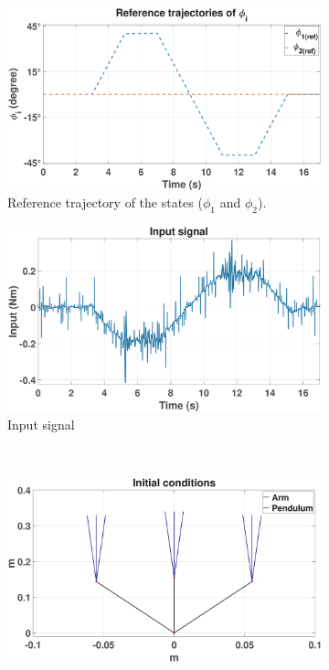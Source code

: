 \begin{figure}[ht]
    \captionsetup[subfigure]{justification=centering}
    \centering
    \begin{subfigure}[t]{1\textwidth}
    \centering
    \includegraphics[width=1\linewidth]{figures/Reference}
    \caption{Reference trajectory of the states ($\phi_1$ and $\phi_2$).}
    \label{fig:ReferenceTraj}
    \end{subfigure}%
    \vspace{0.5em}
    \begin{subfigure}[t]{0.485\textwidth}
    \centering
    \includegraphics[width=\textwidth]{figures/RefInput}
    \caption{Input signal}
    \label{fig:InputSignal}
    \end{subfigure}
    ~
    \begin{subfigure}[t]{0.485\textwidth}
    \centering
    \includegraphics[width=\textwidth]{figures/InitCondn}

\end{subfigure}
\end{figure}
